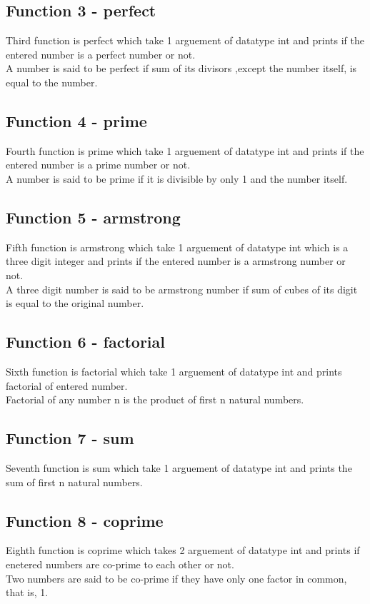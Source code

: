 \documentclass[12pt,a4paper]{article}
\begin{document}
\subsection*{Function 3 - perfect}
Third function is perfect which take 1 arguement of datatype int and prints if the entered number is a perfect number or not.
\\
A number is said to be perfect if sum of its divisors ,except the number itself, is equal to the number.
\\

\subsection*{Function 4 - prime}
Fourth function is prime which take 1 arguement of datatype int and prints if the entered number is a prime number or not.
\\
A number is said to be prime if it is divisible by only 1 and the number itself.
\\

\subsection*{Function 5 - armstrong}
Fifth function is armstrong which take 1 arguement of datatype int which is a three digit integer and prints if the entered number is a armstrong number or not.
\\
A three digit number is said to be armstrong number if sum of cubes of its digit is equal to the original number.
\\

\subsection*{Function 6 - factorial}
Sixth function is factorial which take 1 arguement of datatype int and prints factorial of entered number.
\\
Factorial of any number n is the product of first n natural numbers.
\\

\subsection*{Function 7 - sum}
Seventh function is sum which take 1 arguement of datatype int and prints the sum of first n natural numbers.
\\

\subsection*{Function 8 - coprime}
Eighth function is coprime which takes 2 arguement of datatype int and prints if enetered numbers are co-prime to each other or not.
\\
Two numbers are said to be co-prime if they have only one factor in common, that is, 1.
\\
\end{document}
